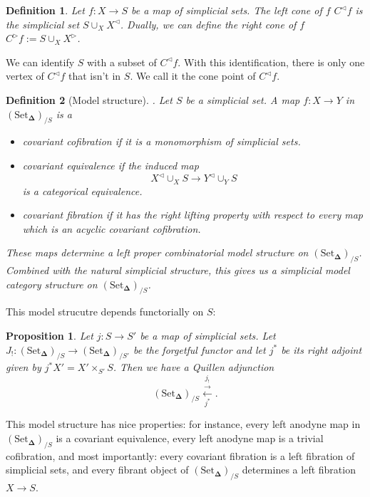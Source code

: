 \documentclass[a4paper, 12pt]{amsart}
\newcommand{\8}{\infty}
\newcommand{\SSet}{\text{Set}_\boldsymbol{\Delta}}
\newtheorem{definition}{Definition}
\newtheorem{proposition}{Proposition}
\begin{document}
\begin{definition}
  Let $f:X\rightarrow S$ be a map of simplicial sets. The left cone of $f$ $C^
      {\triangleleft}f$ is the simplicial set $\displaystyle S\cup_X X^{\triangleleft} $. Dually, we can define the right cone of $f$ $C^{\triangleright}f:=\displaystyle S\cup_X X^{\triangleright}$.
\end{definition}

We can identify $S$ with a subset of $C^{\triangleleft}f$. With this identification, there is only one vertex of $C^{\triangleleft}f$ that isn't in $S$. We call it the cone point of $C^{\triangleleft}f$.

\begin{definition}[Model structure]. Let $S$ be a simplicial set. A map $f:X\rightarrow Y$ in $(\SSet)_{/S}$ is a
  \begin{itemize}
    \item covariant cofibration if it is a monomorphism of simplicial sets.
    \item covariant equivalence if the induced map \[X^{\triangleleft}\displaystyle \cup_X S \rightarrow Y^{\triangleleft}\cup_Y S\] is a categorical equivalence.
    \item covariant fibration if it has the right lifting property with respect to every map which is an acyclic covariant cofibration.
  \end{itemize}
  These maps determine a left proper combinatorial model structure on $(\SSet)_{/S}$. Combined with the natural simplicial structure, this gives us a simplicial model category structure on $(\SSet)_{/S}$.
\end{definition}

This model strucutre depends functorially on $S$:
\begin{proposition}
  Let $j:S\rightarrow S'$ be a map of simplicial sets. Let $J_!: (\SSet)_{/S}\rightarrow (\SSet)_{/S'}$ be the forgetful functor and let $j^*$ be its right adjoint given by $j^*X' = X'\times_{S'} S$. Then we have a Quillen adjunction 
  \[(\SSet)_{/S}\underset{j^*}{\overset{j_!}{\overset{\rightarrow}{\leftarrow}}}.\]
\end{proposition}

This model structure has nice properties: for instance, every left anodyne map in $(\SSet)_{/S}$ is a covariant equivalence, every left anodyne map is a trivial cofibration, and most importantly: every covariant fibration is a left fibration of simplicial sets, and every fibrant object of $(\SSet)_{/S}$ determines a left fibration $X\rightarrow S$.
\end{document}

